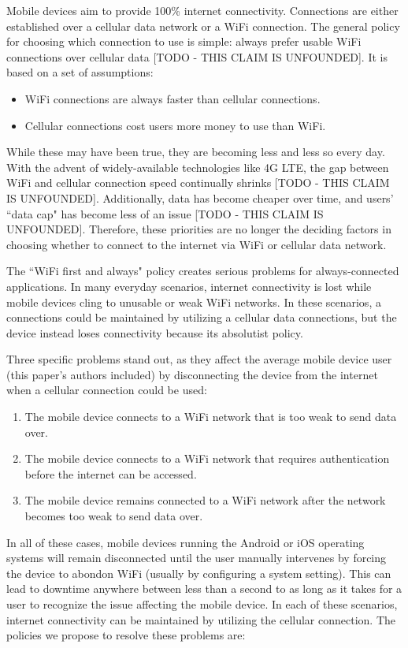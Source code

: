 Mobile devices aim to provide 100\% internet connectivity. Connections are either established over a cellular data network or a WiFi connection. The general policy for choosing which connection to use is simple: always prefer usable WiFi connections over cellular data [TODO - THIS CLAIM IS UNFOUNDED]. It is based on a set of assumptions:

\begin{itemize}
\item WiFi connections are always faster than cellular connections.
\item Cellular connections cost users more money to use than WiFi.
\end{itemize}

While these may have been true, they are becoming less and less so every day. With the advent of widely-available technologies like 4G LTE, the gap between WiFi and cellular connection speed continually shrinks [TODO - THIS CLAIM IS UNFOUNDED]. Additionally, data has become cheaper over time, and users' ``data cap" has become less of an issue [TODO - THIS CLAIM IS UNFOUNDED]. Therefore, these priorities are no longer the deciding factors in choosing whether to connect to the internet via WiFi or cellular data network.

The ``WiFi first and always" policy creates serious problems for always-connected applications. In many everyday scenarios, internet connectivity is lost while mobile devices cling to unusable or weak WiFi networks. In these scenarios, a connections could be maintained by utilizing a cellular data connections, but the device instead loses connectivity because its absolutist policy.

Three specific problems stand out, as they affect the average mobile device user (this paper's authors included) by disconnecting the device from the internet when a cellular connection could be used:

\begin{enumerate}
\item The mobile device connects to a WiFi network that is too weak to send data over.
\item The mobile device connects to a WiFi network that requires authentication before the internet can be accessed.
\item The mobile device remains connected to a WiFi network after the network becomes too weak to send data over.
\end{enumerate}

In all of these cases, mobile devices running the Android or iOS operating systems will remain disconnected until the user manually intervenes by forcing the device to abondon WiFi (usually by configuring a system setting). This can lead to downtime anywhere between less than a second to as long as it takes for a user to recognize the issue affecting the mobile device. In each of these scenarios, internet connectivity can be maintained by utilizing the cellular connection. The policies we propose to resolve these problems are:

